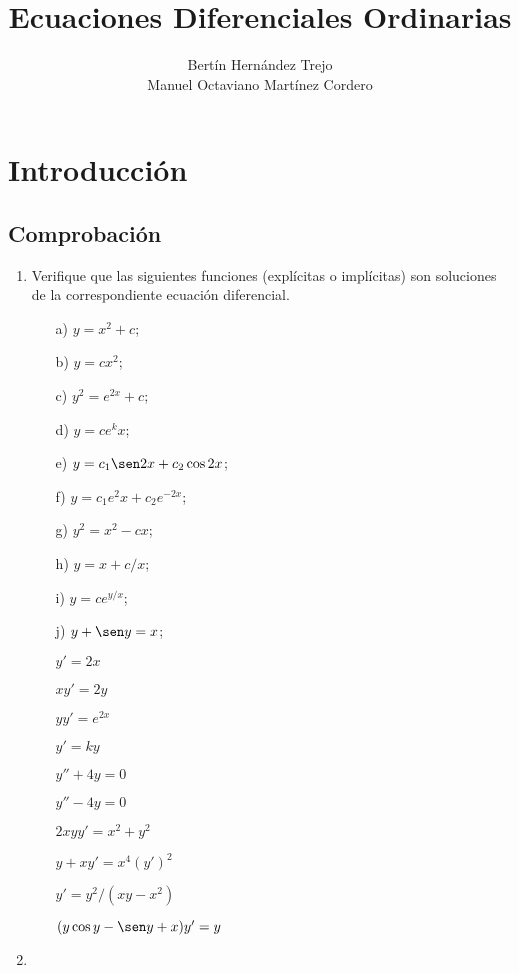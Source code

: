 \documentclass[12pt]{article}
\theoremstyle{definition}
\begin{document}
\author{Bertín Hernández Trejo\\ Manuel Octaviano Martínez Cordero}
\title{Ecuaciones Diferenciales Ordinarias}
\maketitle

\section{Introducción}
\subsection{Comprobación}

\begin{enumerate}
\item Verifique que las siguientes funciones (explícitas o implícitas) son soluciones de la correspondiente ecuación diferencial.
\begin{multicols}{2}
\begin{itemize}
 \item [a)] $y=x^2+c$;
 \item [b)] $y=cx^2$; 
 \item [c)] $y^2=e^{2x}+c$; 
 \item [d)] $y=ce^kx$; 
 \item [e)] $y=c_{1}\sen 2x+c_{2}\cos 2x$; 
 \item [f)] $y=c_{1}e^2x+c_{2}e^{-2x}$; 
 \item [g)] $y^2=x^2-cx$; 
 \item [h)] $y=x+c/x$; 
 \item [i)] $y=ce^{y/x}$; 
 \item [j)] $y+\sen y=x$; 

\item [] $y'=2x$
\item [] $xy'=2y$
\item [] $yy'=e^{2x}$
\item [] $y'=ky$
\item [] $y''+4y=0$
\item [] $y''-4y=0$
\item [] $2xyy'=x^2+y^2$
\item [] $y+xy'=x^4(y')^2$
\item [] $y'=y^2/(xy-x^2)$
\item [] $(y\cos y-\sen y+x)y'=y$
\end{itemize}
\end{multicols}

\item
\end{enumerate}
\end{document}
